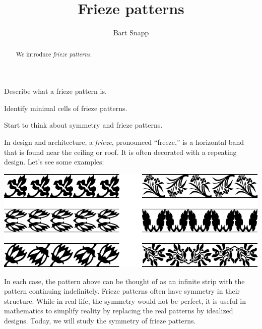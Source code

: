 \documentclass[noauthor,nooutcomes,hints,handout]{ximera}
\author{Bart Snapp}
\title{Frieze patterns}
\begin{document}
\begin{abstract}
  We introduce \emph{frieze patterns}.
\end{abstract}
\maketitle

\begin{listOutcomes}
\item Describe what a frieze pattern is.
\item Identify minimal cells of frieze patterns.
\item Start to think about symmetry and frieze patterns.
\end{listOutcomes}

In design and architecture, a \emph{frieze},
pronounced ``freeze,'' is a horizontal band that is found near the
ceiling or roof. It is often decorated with a repeating design. Let's
see some examples:
\begin{center}
\includegraphics[width=.6\textwidth]{fpfrieze.pdf}
\end{center}
In each case, the pattern above can be thought of as an infinite strip
with the pattern continuing indefinitely.  Frieze patterns often have
symmetry in their structure. While in real-life, the symmetry would
not be perfect, it is useful in mathematics to simplify reality by
replacing the real patterns by idealized designs.  Today, we will
study the symmetry of frieze patterns.
\end{document}
